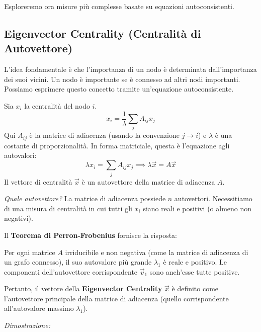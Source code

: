 Esploreremo ora misure più complesse basate su equazioni autoconsistenti.

	
	\subsection{Eigenvector Centrality (Centralità di Autovettore)}
	L'idea fondamentale è che l'importanza di un nodo è determinata dall'importanza dei suoi vicini. Un nodo è importante se è connesso ad altri nodi importanti. Possiamo esprimere questo concetto tramite un'equazione autoconsistente. 
    
    Sia $x_i$ la centralità del nodo $i$.
	\begin{equation}
	    x_i = \frac{1}{\lambda} \sum_{j} A_{ij} x_j
	\end{equation}
	Qui $A_{ij}$ è la matrice di adiacenza (usando la convenzione $j \to i$) e $\lambda$ è una costante di proporzionalità.
	In forma matriciale, questa è l'equazione agli autovalori:
    \begin{equation}
        \lambda x_i = \sum_{j} A_{ij} x_j \implies \lambda \vec{x} = A \vec{x}
    \end{equation}
	Il vettore di centralità $\vec{x}$ è un autovettore della matrice di adiacenza $A$.
	
	\textit{Quale autovettore?} La matrice di adiacenza possiede $n$ autovettori. Necessitiamo di una misura di centralità in cui tutti gli $x_i$ siano reali e positivi (o almeno non negativi).
	
	Il \textbf{Teorema di Perron-Frobenius} fornisce la risposta:
    \begin{tcolorbox}[colback=colorC!15, colframe=colorC!70!colorB,  title=\textbf{Teorema di Perron-Frobenius:}]

		Per ogni matrice $A$ irriducibile e non negativa (come la matrice di adiacenza di un grafo connesso), il suo autovalore più grande $\lambda_1$ è reale e positivo. Le componenti dell'autovettore corrispondente $\vec{v}_1$ sono anch'esse tutte positive.

\end{tcolorbox}
	
	
	Pertanto, il vettore della \textbf{Eigenvector Centrality} $\vec{x}$ è definito come l'autovettore principale della matrice di adiacenza (quello corrispondente all'autovalore massimo $\lambda_1$).
    
    \hfill
    
	\noindent \textit{Dimostrazione:}
    
